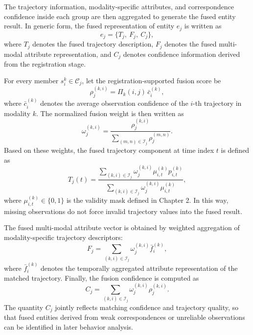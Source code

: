 The trajectory information, modality-specific attributes, and correspondence confidence inside each group are then aggregated to generate the fused entity result. In generic form, the fused representation of entity \(e_j\) is written as
\begin{equation}
  e_j = \{T_j,\ F_j,\ C_j\},
\end{equation}
where \(T_j\) denotes the fused trajectory description, \(F_j\) denotes the fused multi-modal attribute representation, and \(C_j\) denotes confidence information derived from the registration stage.

For every member \(s_i^k \in \mathcal{C}_j\), let the registration-supported fusion score be
\begin{equation}
  \rho_{j}^{(k,i)} = \Pi_k(i,j)\,\bar{c}_i^{(k)},
\end{equation}
where \(\bar{c}_i^{(k)}\) denotes the average observation confidence of the \(i\)-th trajectory in modality \(k\). The normalized fusion weight is then written as
\begin{equation}
  \omega_{j}^{(k,i)} =
  \frac{\rho_{j}^{(k,i)}}{\sum_{(m,n)\in \mathcal{I}_j}\rho_{j}^{(m,n)}}.
\end{equation}
Based on these weights, the fused trajectory component at time index \(t\) is defined as
\begin{equation}
  T_j(t) =
  \frac{
    \sum_{(k,i)\in \mathcal{I}_j}
    \omega_{j}^{(k,i)} \mu_{i,t}^{(k)} p_{i,t}^{(k)}
  }{
    \sum_{(k,i)\in \mathcal{I}_j}
    \omega_{j}^{(k,i)} \mu_{i,t}^{(k)}
  },
\end{equation}
where \(\mu_{i,t}^{(k)}\in\{0,1\}\) is the validity mask defined in Chapter 2. In this way, missing observations do not force invalid trajectory values into the fused result.

The fused multi-modal attribute vector is obtained by weighted aggregation of modality-specific trajectory descriptors:
\begin{equation}
  F_j =
  \sum_{(k,i)\in \mathcal{I}_j}
  \omega_{j}^{(k,i)} \bar{f}_{i}^{(k)},
\end{equation}
where \(\bar{f}_{i}^{(k)}\) denotes the temporally aggregated attribute representation of the matched trajectory. Finally, the fusion confidence is computed as
\begin{equation}
  C_j =
  \sum_{(k,i)\in \mathcal{I}_j}
  \omega_{j}^{(k,i)} \rho_{j}^{(k,i)}.
\end{equation}
The quantity \(C_j\) jointly reflects matching confidence and trajectory quality, so that fused entities derived from weak correspondences or unreliable observations can be identified in later behavior analysis.

